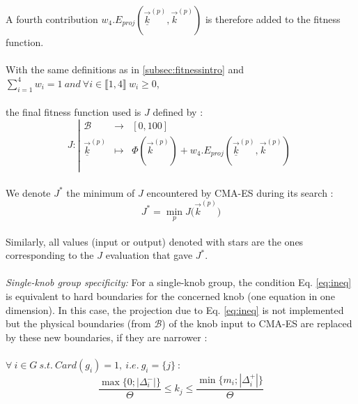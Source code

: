 A fourth contribution $w_{4}.E_{proj}(\underline{\vec{k}}^{(p)},\vec{k}^{(p)})$ is therefore added to the fitness function.\\
\\
With the same definitions as in \ref{subsec:fitnessintro} and\\
$\sum_{i=1}^{4} w_{i}=1\ and\ \forall i\in\llbracket 1,4\rrbracket\ w_{i}\geq 0$,\\
\\
the final fitness function used is $J$ defined by :\\
\begin{equation*}
		J:
		\left|
  		\begin{array}{rcl}
    	\mathscr{B} & \longrightarrow &[0,100] \\
    	\underline{\vec{k}}^{(p)} & \longmapsto &  \Phi(\vec{k}^{(p)})+w_{4}.E_{proj}(\underline{\vec{k}}^{(p)},\vec{k}^{(p)}) \\
  	\end{array}
	\right.
\end{equation*}
\\
We denote $J^{*}$ the minimum of $J$ encountered by CMA-ES during its search :
\begin{equation*}
	J^{*}=\min_{p}{J({\vec{k}^{(p)})}}
\end{equation*}
\\
Similarly, all values (input or output) denoted with stars are the ones corresponding to the $J$ evaluation that gave $J^{*}$.\\
\\
\emph{Single-knob group specificity:} For a single-knob group, the condition Eq. \ref{eq:ineq} is equivalent to hard boundaries for the concerned knob (one equation in one dimension). In this case, the projection due to Eq. \ref{eq:ineq} is not implemented but the physical boundaries (from $\mathscr{B}$) of the knob input to CMA-ES are replaced by these new boundaries, if they are narrower :\\
\\
$\forall\ i\in G\ s.t.\ Card(g_{i})=1,\ i.e.\ g_{i}=\{j\}\ :$
\begin{equation}
	\frac{\max{\big\{0;|\Delta_{i}^{-}|\big\}}}{\Theta}\leq k_{j} \leq \frac{\min{\big\{m_{i};|\Delta_{i}^{+}|\big\}}}{\Theta}
\end{equation}
